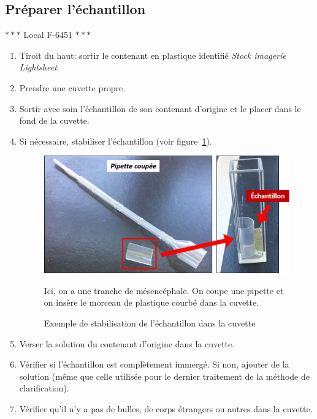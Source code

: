 \subsection{Préparer l'échantillon}
\begin{center} $\ast\ast\ast$ Local F-6451 $\ast\ast\ast$ \end{center}
\begin{enumerate}
    \item Tiroit du haut: sortir le contenant en plastique identifié \textit{Stock imagerie Lightsheet}.
    \item Prendre une cuvette propre.
    \item Sortir avec soin l'échantillon de son contenant d'origine et le placer dans le fond de la cuvette.
    \item Si nécessaire, stabiliser l'échantillon (voir figure~\ref{fig:pipette}).
        \begin{figure}[H]
        \begin{center} \includegraphics[width=13cm]{pipette.png} \end{center}
        \caption{Exemple de stabilisation de l'échantillon dans la cuvette}
        \begin{footnotesize} Ici, on a une tranche de mésencéphale. On coupe une pipette et on insère le morceau de plastique courbé dans la cuvette. \end{footnotesize}
        \label{fig:pipette}
        \end{figure}
    \item Verser la solution du contenant d'origine dans la cuvette.
    \item Vérifier si l'échantillon est complètement immergé. Si non, ajouter de la solution (même que celle utilisée pour le dernier traitement de la méthode de clarification).
    \item Vérifier qu'il n'y a pas de bulles, de corps étrangers ou autres dans la cuvette.

\end{enumerate}
